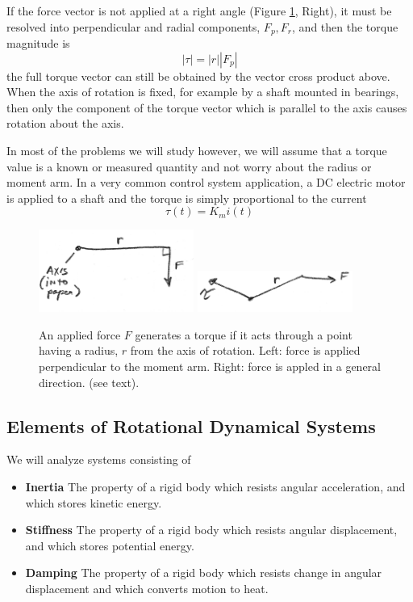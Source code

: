 If the force vector is not applied at a right angle (Figure \ref{forceradisutorque}, Right), it must be resolved into  perpendicular and radial components, $F_p, F_r$, and then the torque magnitude is
\[
|\tau| = |r||F_p|
\]
the full torque vector can still be obtained by the vector cross product above.   When the axis of rotation is fixed, for example by a shaft mounted in bearings, then only the component of the torque vector which is parallel to the axis causes rotation about the axis. 

In most of the problems we will study however, we will assume that a torque value is a known or measured quantity and not worry about the radius or moment arm.  In a very common control system application, a DC electric motor is applied to a shaft and the torque is simply proportional to the current 
\[
\tau(t) = K_m i(t)
\]

\begin{figure}\centering
\includegraphics[width=2.0in]{figs03/00749.png} \hspace{0.75in}
\includegraphics[width=2.0in]{figs03/00750.png}
\caption{An applied force $F$ generates a torque if it acts through a point having a radius, $r$ from the axis of rotation. Left: force is applied perpendicular to the moment arm. Right: force is appled in a general direction. (see text).}\label{forceradisutorque}
\end{figure}


















\subsection{Elements of Rotational Dynamical Systems}
We will analyze systems consisting of 
\begin{itemize}
  \item {\bf Inertia}     The property of a rigid body which resists angular acceleration, and which stores kinetic energy. 
  \item {\bf Stiffness}   The property of a rigid body which resists angular displacement, and which stores potential energy. 
  \item {\bf Damping}     The property of a rigid body which resists change in angular displacement and which converts motion to heat. 
\end{itemize}


